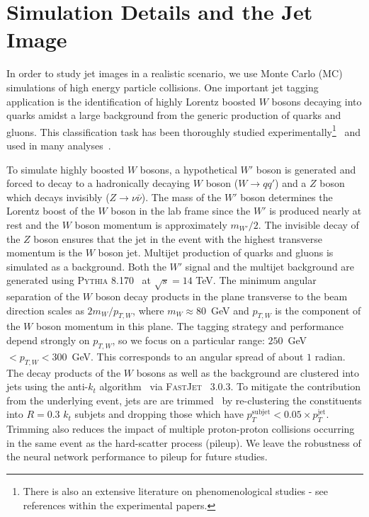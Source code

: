 \section{Simulation Details and the Jet Image}
\label{sec:simulation}

In order to study jet images in a realistic scenario, we use Monte Carlo (MC) simulations of high energy particle collisions. One important jet tagging application is the identification of highly Lorentz boosted $W$ bosons decaying into quarks amidst a large background from the generic production of quarks and gluons.  This classification task has been thoroughly studied experimentally\footnote{There is also an extensive literature on phenomenological studies - see references within the experimental papers.}~\cite{Khachatryan:2014vla,ATL-PHYS-PUB-2015-033,ATL-PHYS-PUB-2014-004} and used in many analyses~\cite{Aad:2015owa,Khachatryan:2014hpa,Khachatryan:2015mta,Khachatryan:2015oba,Khachatryan:2015gza,Khachatryan:2015bma,Khachatryan:2015cwa,Khachatryan:2015ywa,Aad:2014wea,Aad:2015agg,Aad:2015kna,Aad:2015ufa,Aad:2014haa}.  

To simulate highly boosted $W$ bosons, a hypothetical $W'$ boson is generated and forced to decay to a hadronically decaying $W$ boson ($W\rightarrow qq'$) and a $Z$ boson which decays invisibly ($Z\rightarrow \nu\bar{\nu}$).  The mass of the $W'$ boson determines the Lorentz boost of the $W$ boson in the lab frame since the $W'$ is produced nearly at rest and the $W$ boson momentum is approximately $m_{W'}/2$.  The invisible decay of the $Z$ boson ensures that the jet in the event with the highest transverse momentum is the $W$ boson jet.  Multijet production of quarks and gluons is simulated as a background.  Both the $W'$ signal and the multijet background are generated using \textsc{Pythia} 8.170~\cite{Pythia8,Pythia} at $\sqrt{s}=14$ TeV.  The minimum angular separation of the $W$ boson decay products in the plane transverse to the beam direction scales as $2m_{W}/p_{T,W}$, where $m_W\approx 80$~GeV and $p_{T,W}$ is the component of the $W$ boson momentum in this plane.  The tagging strategy and performance depend strongly on $p_{T,W}$, so we focus on a particular range: $250$~GeV~$<p_{T,W}<300$~GeV.  This corresponds to an angular spread of about $1$ radian.  The decay products of the $W$ bosons as well as the background are clustered into jets using the anti-$k_t$ algorithm~\cite{antiktpaper} via \textsc{FastJet}~\cite{fastjet} 3.0.3.  To mitigate the contribution from the underlying event, jets are are trimmed~\cite{trimming} by re-clustering the constituents into $R=0.3$ $k_t$ subjets and dropping those which have $p_T^\text{subjet}<0.05\times p_T^\text{jet}$.  Trimming also reduces the impact of multiple proton-proton collisions occurring in the same event as the hard-scatter process (pileup).  We leave the robustness of the neural network performance to pileup for future studies.

